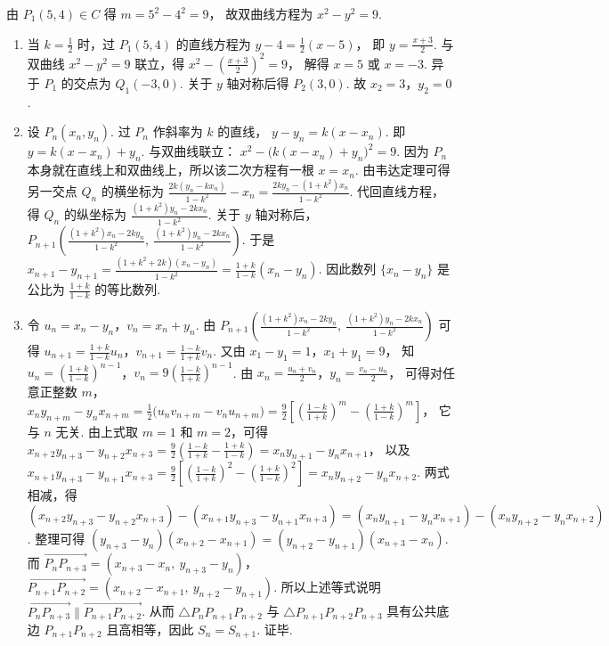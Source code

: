 \begin{solution}
由 \(P_1(5,4)\in C\) 得
\(m=5^2-4^2=9\)，
故双曲线方程为
\(x^2-y^2=9\).

\begin{enumerate}
\item 当 \(k=\frac12\) 时，过 \(P_1(5,4)\) 的直线方程为
\(y-4=\frac12(x-5)\)，
即
\(y=\frac{x+3}{2}\).
与双曲线 \(x^2-y^2=9\) 联立，得
\(x^2-\left(\frac{x+3}{2}\right)^2=9\)，
解得 \(x=5\) 或 \(x=-3\). 异于 \(P_1\) 的交点为
\(Q_1(-3,0)\).
关于 \(y\) 轴对称后得
\(P_2(3,0)\).
故
\(x_2=3\)，\(y_2=0\).

\item 设
\(P_n(x_n,y_n)\).
过 \(P_n\) 作斜率为 \(k\) 的直线，
\(y-y_n=k(x-x_n)\).
即
\(y=k(x-x_n)+y_n\).
与双曲线联立：
\(x^2-\bigl(k(x-x_n)+y_n\bigr)^2=9\).
因为 \(P_n\) 本身就在直线上和双曲线上，所以该二次方程有一根 \(x=x_n\). 由韦达定理可得另一交点 \(Q_n\) 的横坐标为
\(\frac{2k(y_n-kx_n)}{1-k^2}-x_n=\frac{2ky_n-(1+k^2)x_n}{1-k^2}\).
代回直线方程，得 \(Q_n\) 的纵坐标为
\(\frac{(1+k^2)y_n-2kx_n}{1-k^2}\).
关于 \(y\) 轴对称后，
\(P_{n+1}\left(\frac{(1+k^2)x_n-2ky_n}{1-k^2},\ \frac{(1+k^2)y_n-2kx_n}{1-k^2}\right)\).
于是
\(x_{n+1}-y_{n+1} =\frac{(1+k^2+2k)(x_n-y_n)}{1-k^2} =\frac{1+k}{1-k}(x_n-y_n)\).
因此数列 \(\{x_n-y_n\}\) 是公比为
\(\frac{1+k}{1-k}\)
的等比数列.

\item 令
\(u_n=x_n-y_n\)，\(v_n=x_n+y_n\).
由
\(P_{n+1}\left(\frac{(1+k^2)x_n-2ky_n}{1-k^2},\ \frac{(1+k^2)y_n-2kx_n}{1-k^2}\right)\)
可得
\(u_{n+1}=\frac{1+k}{1-k}u_n\)，\(v_{n+1}=\frac{1-k}{1+k}v_n\).
又由
\(x_1-y_1=1\)，\(x_1+y_1=9\)，
知
\(u_n=\left(\frac{1+k}{1-k}\right)^{n-1}\)，\(v_n=9\left(\frac{1-k}{1+k}\right)^{n-1}\).
由
\(x_n=\frac{u_n+v_n}{2}\)，\(y_n=\frac{v_n-u_n}{2}\)，
可得对任意正整数 \(m\)，
\(x_ny_{n+m}-y_nx_{n+m} =\frac12\bigl(u_n v_{n+m}-v_n u_{n+m}\bigr) =\frac92\left[\left(\frac{1-k}{1+k}\right)^m-\left(\frac{1+k}{1-k}\right)^m\right]\)，
它与 \(n\) 无关.
由上式取 \(m=1\) 和 \(m=2\)，可得
\(x_{n+2}y_{n+3}-y_{n+2}x_{n+3} =\frac92\left(\frac{1-k}{1+k}-\frac{1+k}{1-k}\right) =x_ny_{n+1}-y_nx_{n+1}\)，
以及
\(x_{n+1}y_{n+3}-y_{n+1}x_{n+3} =\frac92\left[\left(\frac{1-k}{1+k}\right)^2-\left(\frac{1+k}{1-k}\right)^2\right] =x_ny_{n+2}-y_nx_{n+2}\).
两式相减，得
\((x_{n+2}y_{n+3}-y_{n+2}x_{n+3})-(x_{n+1}y_{n+3}-y_{n+1}x_{n+3}) =(x_ny_{n+1}-y_nx_{n+1})-(x_ny_{n+2}-y_nx_{n+2})\).
整理可得
\((y_{n+3}-y_n)(x_{n+2}-x_{n+1})=(y_{n+2}-y_{n+1})(x_{n+3}-x_n)\).
而
\(\overrightarrow{P_nP_{n+3}}=(x_{n+3}-x_n,\ y_{n+3}-y_n)\)，\(\overrightarrow{P_{n+1}P_{n+2}}=(x_{n+2}-x_{n+1},\ y_{n+2}-y_{n+1})\).
所以上述等式说明
\(\overrightarrow{P_nP_{n+3}}\parallel \overrightarrow{P_{n+1}P_{n+2}}\).
从而 \(\triangle P_nP_{n+1}P_{n+2}\) 与 \(\triangle P_{n+1}P_{n+2}P_{n+3}\) 具有公共底边 \(P_{n+1}P_{n+2}\) 且高相等，因此
\(S_n=S_{n+1}\).
证毕.
\end{enumerate}
\end{solution}
